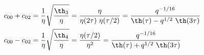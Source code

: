 \begin{equation}
  \begin{split}
    c_{00} + c_{02} &= {1\over\eta}{\sqrt{{\th_3\over\eta}}} =
    {\eta\over\eta(2\tau) ~\eta(\tau/2)} 
    = {q^{-1/16}\over \th(\tau) -q^{1/2}~\th(3\tau) } \\
    c_{00} - c_{02} &= {1\over\eta}{\sqrt{{\th_4\over\eta}}} =
    {\eta(\tau/2) \over\eta^2}  
    = {q^{-1/16}\over \th(\tau) +q^{1/2}~\th(3\tau) }
  \end{split}
\end{equation}

